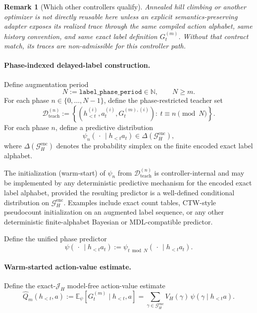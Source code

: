 \documentclass[11pt]{article}
\newtheorem{remark}{Remark}
\begin{document}
\begin{remark}[Which other controllers qualify]
Annealed hill climbing or another optimizer is not directly reusable here
unless an explicit semantics-preserving adapter exposes its realized trace
through the same compiled action alphabet, same history convention, and same
exact label definition $G_t^{(m)}$. Without that contract match, its traces are
non-admissible for this controller path.
\end{remark}

\paragraph{Phase-indexed delayed-label construction.}
Define augmentation period
\[
N:=\texttt{label\_phase\_period}\in\mathbb{N},\qquad N\ge m.
\]
For each phase $n\in\{0,\dots,N-1\}$, define the phase-restricted teacher set
\[
\mathcal{D}_{\mathrm{teach}}^{(n)}
:=
\left\{
(h_{<t}^{(i)},a_t^{(i)},G_t^{(m),(i)}):
\ t \equiv n \pmod N
\right\}.
\]
For each phase $n$, define a predictive distribution
\[
\psi_n(\,\cdot\,\mid h_{<t}a_t)
\in
\Delta(\mathcal{G}_H^{\mathrm{enc}}),
\]
where $\Delta(\mathcal{G}_H^{\mathrm{enc}})$ denotes the probability simplex on the finite
encoded exact label alphabet.

The initialization (warm-start) of $\psi_n$ from
$\mathcal{D}_{\mathrm{teach}}^{(n)}$ is controller-internal and may be implemented
by any deterministic predictive mechanism for the encoded exact label alphabet,
provided the resulting predictor is a well-defined conditional distribution on
$\mathcal{G}_H^{\mathrm{enc}}$. Examples include exact count tables, CTW-style pseudocount
initialization on an augmented label sequence, or any other deterministic
finite-alphabet Bayesian or MDL-compatible predictor.

Define the unified phase predictor
\[
\psi(\,\cdot\,\mid h_{<t}a_t):=
\psi_{t\bmod N}(\,\cdot\,\mid h_{<t}a_t).
\]

\paragraph{Warm-started action-value estimate.}
Define the exact-$\mathcal{J}_H$ model-free action-value estimate
\[
\widehat Q_m(h_{<t},a)
:=
\mathbb{E}_{\psi}\!\left[G_t^{(m)}\mid h_{<t},a\right]
=
\sum_{\gamma\in\mathcal{G}_H^{\mathrm{enc}}}
V_H(\gamma)\,\psi(\gamma\mid h_{<t}a).
\]
\end{document}
